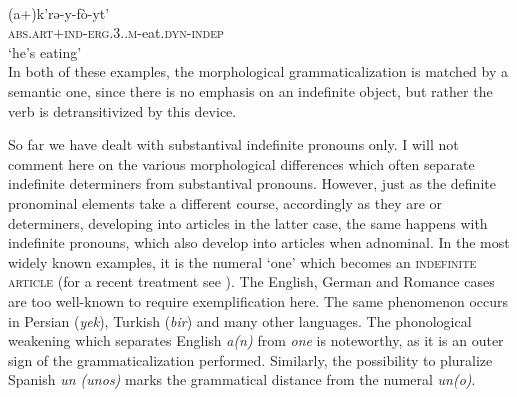 \ea\label{ex:E23}
\\
\gll (a+)k'rə-y-fò-yt'\\
 \textsc{abs}.\textsc{art}+\textsc{ind}-\textsc{erg}.3.\glsg.\textsc{m}-eat.\textsc{dyn}-\textsc{indep}\\
\glt ‘he's eating’ \\
\z
\noindent In both of these examples, the morphological grammaticalization is matched by a semantic one, since there is no emphasis on an indefinite object, but rather the verb is detransitivized by this device.

So far we have dealt with substantival indefinite pronouns only. I will not comment here on the various morphological differences which often separate indefinite determiners from substantival pronouns. However, just as the definite pronominal elements take a different course, accordingly as they are \nps or determiners, developing into articles in the latter case, the same happens with indefinite pronouns, which also develop into articles when adnominal. In the most widely known examples, it is the numeral ‘one’ which becomes an \textsc{indefinite article} (for a recent treatment see \citealt{Givón1981}). The English, German and Romance cases are too well-known to require exemplification here. The same phenomenon occurs in Persian (\textit{yek}), Turkish (\textit{bir}) and many other languages. The phonological weakening which separates English \textit{a(n)} from \textit{one} is noteworthy, as it is an outer sign of the grammaticalization performed. Similarly, the possibility to pluralize Spanish \textit{un (unos)} marks the grammatical distance from the numeral \textit{un(o)}.\label{p56}

